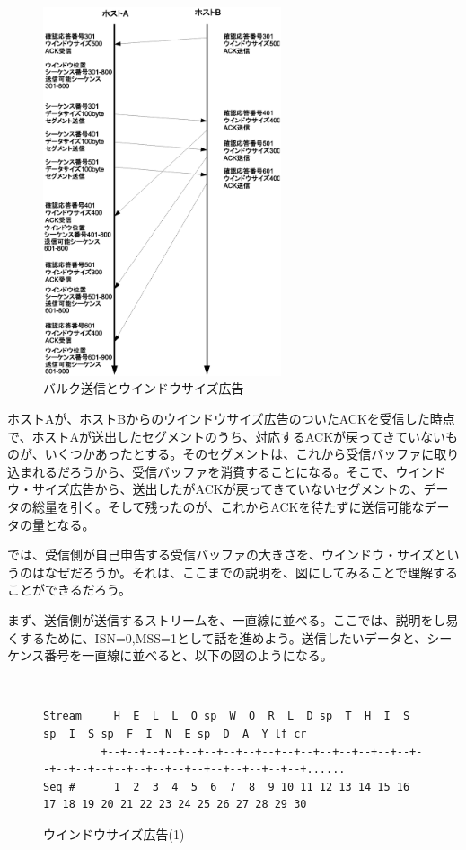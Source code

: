 \begin{figure}
	\includegraphics[width=7cm, clip]{draw/tcp07n.eps}
	\caption{バルク送信とウインドウサイズ広告}
	\label{fig:tcp07}
\end{figure}

ホストAが、ホストBからのウインドウサイズ広告のついたACKを受信した時点で、ホストAが送出したセグメントのうち、対応するACKが戻ってきていないものが、いくつかあったとする。そのセグメントは、これから受信バッファに取り込まれるだろうから、受信バッファを消費することになる。そこで、ウインドウ・サイズ広告から、送出したがACKが戻ってきていないセグメントの、データの総量を引く。そして残ったのが、これからACKを待たずに送信可能なデータの量となる。

では、受信側が自己申告する受信バッファの大きさを、ウインドウ・サイズというのはなぜだろうか。それは、ここまでの説明を、図にしてみることで理解することができるだろう。

まず、送信側が送信するストリームを、一直線に並べる。ここでは、説明をし易くするために、ISN=0,MSS=1として話を進めよう。送信したいデータと、シーケンス番号を一直線に並べると、以下の図のようになる。

\begin{figure}[h!] \caption{ウインドウサイズ広告(1)}　\label{windowsize1}
\begin{center}
{\scriptsize
\begin{verbatim}
Stream     H  E  L  L  O sp  W  O  R  L  D sp  T  H  I  S sp  I  S sp  F  I  N  E sp  D  A  Y lf cr              
         +--+--+--+--+--+--+--+--+--+--+--+--+--+--+--+--+--+--+--+--+--+--+--+--+--+--+--+--+--+--+......
Seq #      1  2  3  4  5  6  7  8  9 10 11 12 13 14 15 16 17 18 19 20 21 22 23 24 25 26 27 28 29 30  
\end{verbatim}
}
\end{center}
\end{figure}

